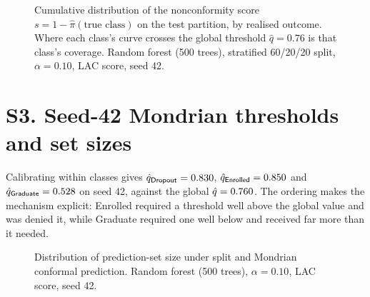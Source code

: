 \begin{figure}[htbp]
\caption{Cumulative distribution of the nonconformity score
$s = 1-\hat{\pi}(\text{true class})$ on the test partition, by realised outcome.
Where each class's curve crosses the global threshold $\hat q = 0.76$ is that
class's coverage. Random forest (500 trees), stratified 60/20/20 split,
$\alpha = 0.10$, LAC score, seed 42.}
\label{fig:ecdf}
\end{figure}
\section*{S3. Seed-42 Mondrian thresholds and set sizes}
Calibrating within classes gives $\hat{q}_{\textsf{Dropout}} = 0.830$,
$\hat{q}_{\textsf{Enrolled}} = 0.850$ and $\hat{q}_{\textsf{Graduate}} = 0.528$ on
seed 42, against the global $\hat{q} = 0.760$. The ordering makes the mechanism
explicit: \textsf{Enrolled} required a threshold well above the global value and
was denied it, while \textsf{Graduate} required one well below and received far
more than it needed.


\begin{figure}[htbp]
\centering
{}
\caption{Distribution of prediction-set size under split and Mondrian conformal
prediction. Random forest (500 trees), $\alpha = 0.10$, LAC score, seed 42.}
\label{fig:setsize}
\end{figure}
